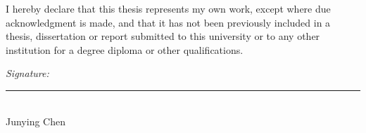




I hereby declare that this thesis represents my own work, except where due acknowledgment is made, and that it has not been previously included in a thesis, dissertation or report submitted to this university or to any other institution for a degree diploma or other qualifications.

\vspace{20mm}

\begin{flushright}
\textit{Signature: }\rule{5cm}{0.5pt}\\
Junying Chen \qquad\qquad\qquad\qquad
\end{flushright}




